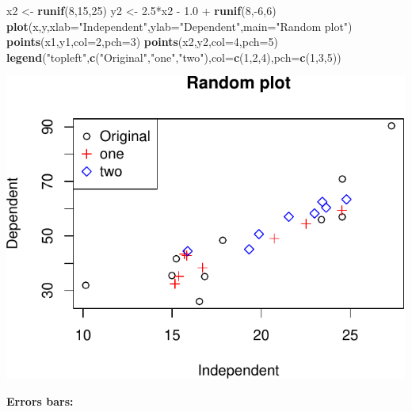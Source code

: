 \documentclass[]{article}
\newenvironment{Shaded}{\begin{snugshade}}{\end{snugshade}}
\newcommand{\KeywordTok}[1]{\textcolor[rgb]{0.13,0.29,0.53}{\textbf{{#1}}}}
\newcommand{\DataTypeTok}[1]{\textcolor[rgb]{0.13,0.29,0.53}{{#1}}}
\newcommand{\DecValTok}[1]{\textcolor[rgb]{0.00,0.00,0.81}{{#1}}}
\newcommand{\FloatTok}[1]{\textcolor[rgb]{0.00,0.00,0.81}{{#1}}}
\newcommand{\StringTok}[1]{\textcolor[rgb]{0.31,0.60,0.02}{{#1}}}
\newcommand{\NormalTok}[1]{{#1}}
\numberwithin{equation}{section}
\begin{document}
\begin{Shaded}
\begin{Highlighting}[]
\NormalTok{x2 <-}\StringTok{ }\KeywordTok{runif}\NormalTok{(}\DecValTok{8}\NormalTok{,}\DecValTok{15}\NormalTok{,}\DecValTok{25}\NormalTok{)}
\NormalTok{y2 <-}\StringTok{ }\FloatTok{2.5}\NormalTok{*x2 -}\StringTok{ }\FloatTok{1.0} \NormalTok{+}\StringTok{ }\KeywordTok{runif}\NormalTok{(}\DecValTok{8}\NormalTok{,-}\DecValTok{6}\NormalTok{,}\DecValTok{6}\NormalTok{)}
 \KeywordTok{plot}\NormalTok{(x,y,}\DataTypeTok{xlab=}\StringTok{"Independent"}\NormalTok{,}\DataTypeTok{ylab=}\StringTok{"Dependent"}\NormalTok{,}\DataTypeTok{main=}\StringTok{"Random plot"}\NormalTok{)}
 \KeywordTok{points}\NormalTok{(x1,y1,}\DataTypeTok{col=}\DecValTok{2}\NormalTok{,}\DataTypeTok{pch=}\DecValTok{3}\NormalTok{)}
 \KeywordTok{points}\NormalTok{(x2,y2,}\DataTypeTok{col=}\DecValTok{4}\NormalTok{,}\DataTypeTok{pch=}\DecValTok{5}\NormalTok{)}
 \KeywordTok{legend}\NormalTok{(}\StringTok{"topleft"}\NormalTok{,}\KeywordTok{c}\NormalTok{(}\StringTok{"Original"}\NormalTok{,}\StringTok{"one"}\NormalTok{,}\StringTok{"two"}\NormalTok{),}\DataTypeTok{col=}\KeywordTok{c}\NormalTok{(}\DecValTok{1}\NormalTok{,}\DecValTok{2}\NormalTok{,}\DecValTok{4}\NormalTok{),}\DataTypeTok{pch=}\KeywordTok{c}\NormalTok{(}\DecValTok{1}\NormalTok{,}\DecValTok{3}\NormalTok{,}\DecValTok{5}\NormalTok{))}
\end{Highlighting}
\end{Shaded}

\includegraphics{index_files/figure-latex/unnamed-chunk-79-1.pdf}

\textbf{Errors bars:}
\end{document}
